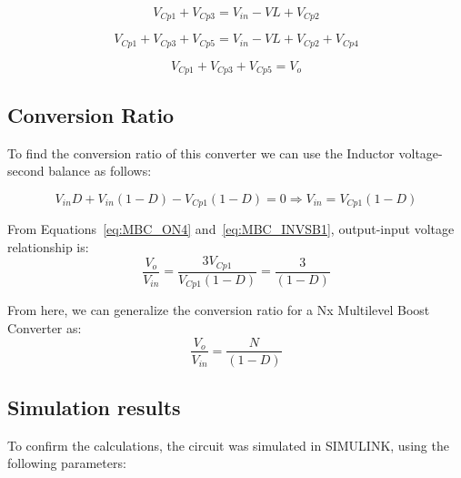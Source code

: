 \begin{equation}
	V_{Cp1} + V_{Cp3} = V_{in} - V{L} + V_{Cp2}
	\label{eq:MBC_OFF2}
\end{equation}
 
\begin{equation}
	V_{Cp1} + V_{Cp3} + V_{Cp5} = V_{in} - V{L} + V_{Cp2} + V_{Cp4}
	\label{eq:MBC_OFF3}
\end{equation}

\begin{equation}
	V_{Cp1} + V_{Cp3} + V_{Cp5} = V_o
	\label{eq:MBC_OFF4}
\end{equation}

\subsection{Conversion Ratio}

To find the conversion ratio of this converter we can use the Inductor voltage-second balance as follows:

\begin{equation}
	V_{in}D + V_{in}(1-D) - V_{Cp1}(1-D)= 0 
	\Rightarrow
	V_{in} = V_{Cp1}(1-D)
	\label{eq:MBC_INVSB1}
\end{equation}

From Equations~\ref{eq:MBC_ON4} and~\ref{eq:MBC_INVSB1}, output-input voltage relationship is:
\begin{equation}
	\frac{V_o}{V_{in}} = \frac{3V_{Cp1}}{V_{Cp1}(1-D)} = \frac{3}{(1-D)}
	\label{eq:MBC_INVSB2}
\end{equation}

From here, we can generalize the conversion ratio for a Nx Multilevel Boost Converter as:
\begin{equation}
	\frac{V_o}{V_{in}} = \frac{N}{(1-D)}
	\label{eq:MBC_INVSB3}
\end{equation}

\subsection{Simulation results}

To confirm the calculations, the circuit was simulated in SIMULINK, using the following parameters: 

